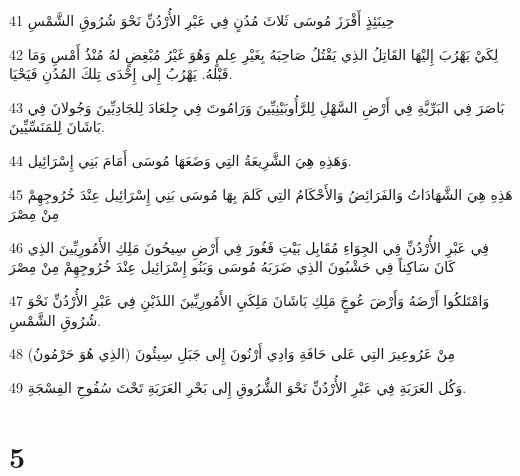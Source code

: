 \par 41 حِينَئِذٍ أَفْرَزَ مُوسَى ثَلاثَ مُدُنٍ فِي عَبْرِ الأُرْدُنِّ نَحْوَ شُرُوقِ الشَّمْسِ
\par 42 لِكَيْ يَهْرُبَ إِليْهَا القَاتِلُ الذِي يَقْتُلُ صَاحِبَهُ بِغَيْرِ عِلمٍ وَهُوَ غَيْرُ مُبْغِضٍ لهُ مُنْذُ أَمْسِ وَمَا قَبْلهُ. يَهْرُبُ إِلى إِحْدَى تِلكَ المُدُنِ فَيَحْيَا.
\par 43 بَاصَرَ فِي البَرِّيَّةِ فِي أَرْضِ السَّهْلِ لِلرَّأُوبَيْنِيِّينَ وَرَامُوتَ فِي جِلعَادَ لِلجَادِيِّينَ وَجُولانَ فِي بَاشَانَ لِلمَنَسِّيِّينَ.
\par 44 وَهَذِهِ هِيَ الشَّرِيعَةُ التِي وَضَعَهَا مُوسَى أَمَامَ بَنِي إِسْرَائِيل.
\par 45 هَذِهِ هِيَ الشَّهَادَاتُ وَالفَرَائِضُ وَالأَحْكَامُ التِي كَلمَ بِهَا مُوسَى بَنِي إِسْرَائِيل عِنْدَ خُرُوجِهِمْ مِنْ مِصْرَ
\par 46 فِي عَبْرِ الأُرْدُنِّ فِي الجِوَاءِ مُقَابِل بَيْتِ فَغُورَ فِي أَرْضِ سِيحُونَ مَلِكِ الأَمُورِيِّينَ الذِي كَانَ سَاكِناً فِي حَشْبُونَ الذِي ضَرَبَهُ مُوسَى وَبَنُو إِسْرَائِيل عِنْدَ خُرُوجِهِمْ مِنْ مِصْرَ
\par 47 وَامْتَلكُوا أَرْضَهُ وَأَرْضَ عُوجٍَ مَلِكِ بَاشَانَ مَلِكَيِ الأَمُورِيِّينَ اللذَيْنِ فِي عَبْرِ الأُرْدُنِّ نَحْوَ شُرُوقِ الشَّمْسِ.
\par 48 مِنْ عَرُوعِيرَ التِي عَلى حَافَةِ وَادِي أَرْنُونَ إِلى جَبَلِ سِيئُونَ (الذِي هُوَ حَرْمُونُ)
\par 49 وَكُل العَرَبَةِ فِي عَبْرِ الأُرْدُنِّ نَحْوَ الشُّرُوقِ إِلى بَحْرِ العَرَبَةِ تَحْتَ سُفُوحِ الفِسْجَةِ.

\chapter{5}

